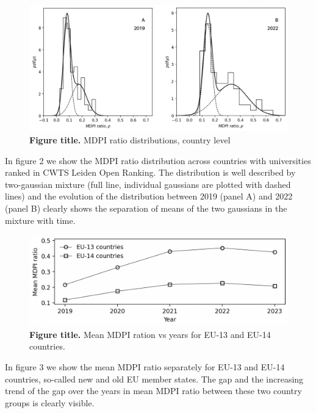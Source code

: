 \documentclass[amsfonts, amssymb, prl, superscriptaddress, notitlepage, twocolumn, nofootinbib]{revtex4-2}
\begin{document}
\begin{figure}
    \centering
    \includegraphics[width=1.0\linewidth]{Fig02.png}
    \caption{\label{fig:fig2} {\bf Figure title.} MDPI ratio distributions, country level  
    }
\end{figure}

In figure 2 we show the MDPI ratio distribution across countries with universities ranked in CWTS Leiden Open Ranking. The distribution is well described by two-gaussian mixture (full line, individual gaussians  are plotted with dashed lines) and the evolution of the distribution between 2019 (panel A) and 2022 (panel B) clearly shows the separation of means of the two gaussians in the mixture with time.  

\begin{figure}
    \centering
    \includegraphics[width=1.0\linewidth]{Fig01a.png}
    \caption{\label{fig:fig3} {\bf Figure title.} Mean MDPI ration vs years for EU-13 and EU-14 countries.  
}
\end{figure}

In figure 3 we show the mean MDPI ratio separately for EU-13 and EU-14 countries, so-called new and old EU member states. The
gap and the increasing trend of the gap over the years in mean MDPI ratio between these two country groups is clearly visible. 
\end{document}
